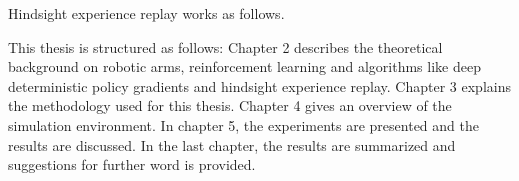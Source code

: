 \vspace{0.5cm}


Hindsight experience replay works as follows.


\vspace{0.5cm}




\vspace{0.5cm}




This thesis is structured as follows: 
Chapter 2 describes the theoretical background on robotic arms, reinforcement learning and algorithms like deep deterministic policy gradients and hindsight experience replay. 
Chapter 3 explains the methodology used for this thesis.
Chapter 4 gives an overview of the simulation environment.
In chapter 5, the experiments are presented and the results are discussed.
In the last chapter, the results are summarized and suggestions for further word is provided.




